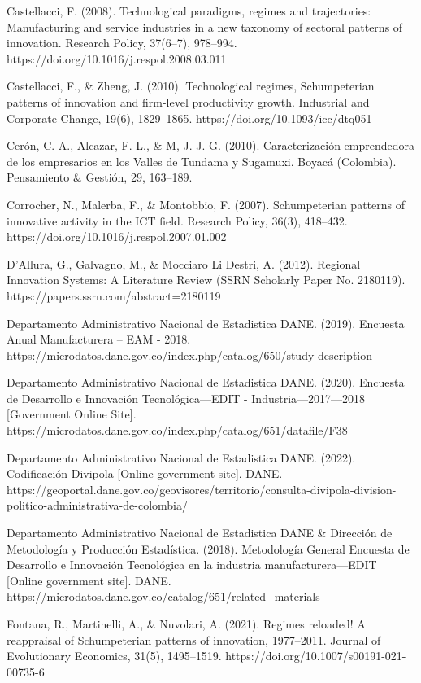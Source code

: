\documentclass[12pt,a4paper]{article}
\begin{document}
{Castellacci, F. (2008). Technological paradigms, regimes and trajectories: Manufacturing and service industries in a new taxonomy of sectoral patterns of innovation. Research Policy, 37(6–7), 978–994. https://doi.org/10.1016/j.respol.2008.03.011

Castellacci, F., \& Zheng, J. (2010). Technological regimes, Schumpeterian patterns of innovation and firm-level productivity growth. Industrial and Corporate Change, 19(6), 1829–1865. https://doi.org/10.1093/icc/dtq051

Cerón, C. A., Alcazar, F. L., \& M, J. J. G. (2010). Caracterización emprendedora de los empresarios en los Valles de Tundama y Sugamuxi. Boyacá (Colombia). Pensamiento \& Gestión, 29, 163–189.

Corrocher, N., Malerba, F., \& Montobbio, F. (2007). Schumpeterian patterns of innovative activity in the ICT field. Research Policy, 36(3), 418–432. https://doi.org/10.1016/j.respol.2007.01.002

D’Allura, G., Galvagno, M., \& Mocciaro Li Destri, A. (2012). Regional Innovation Systems: A Literature Review (SSRN Scholarly Paper No. 2180119). https://papers.ssrn.com/abstract=2180119

Departamento Administrativo Nacional de Estadistica DANE. (2019). Encuesta Anual Manufacturera – EAM - 2018. https://microdatos.dane.gov.co/index.php/catalog/650/study-description

Departamento Administrativo Nacional de Estadistica DANE. (2020). Encuesta de Desarrollo e Innovación Tecnológica—EDIT - Industria—2017—2018 [Government Online Site]. https://microdatos.dane.gov.co/index.php/catalog/651/datafile/F38

Departamento Administrativo Nacional de Estadistica DANE. (2022). Codificación Divipola [Online government site]. DANE. https://geoportal.dane.gov.co/geovisores/territorio/consulta-divipola-division-politico-administrativa-de-colombia/

Departamento Administrativo Nacional de Estadistica DANE \& Dirección de Metodología y Producción Estadística. (2018). Metodología General Encuesta de Desarrollo e Innovación Tecnológica en la industria manufacturera—EDIT [Online government site]. DANE. https://microdatos.dane.gov.co/catalog/651/related\_materials

Fontana, R., Martinelli, A., \& Nuvolari, A. (2021). Regimes reloaded! A reappraisal of Schumpeterian patterns of innovation, 1977–2011. Journal of Evolutionary Economics, 31(5), 1495–1519. https://doi.org/10.1007/s00191-021-00735-6

}
\end{document}
